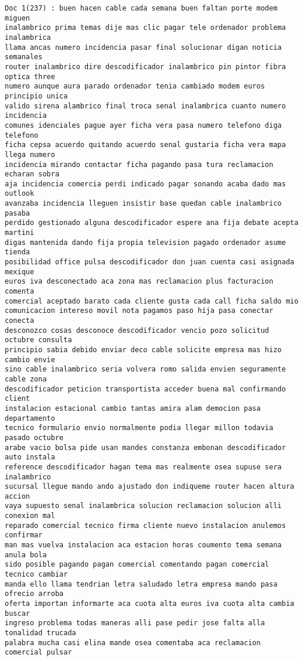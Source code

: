 \begin{Verbatim}[commandchars=\\\{\}]
Doc 1(237) : buen hacen cable cada semana buen faltan porte modem miguen
inalambrico prima temas dije mas clic pagar tele ordenador problema inalambrica
llama ancas numero incidencia pasar final solucionar digan noticia semanales
router inalambrico dire descodificador inalambrico pin pintor fibra optica three
numero aunque aura parado ordenador tenia cambiado modem euros principio unica
valido sirena alambrico final troca senal inalambrica cuanto numero incidencia
comunes idenciales pague ayer ficha vera pasa numero telefono diga telefono
ficha cepsa acuerdo quitando acuerdo senal gustaria ficha vera mapa llega numero
incidencia mirando contactar ficha pagando pasa tura reclamacion echaran sobra
aja incidencia comercia perdi indicado pagar sonando acaba dado mas outlook
avanzaba incidencia lleguen insistir base quedan cable inalambrico pasaba
perdido gestionado alguna descodificador espere ana fija debate acepta martini
digas mantenida dando fija propia television pagado ordenador asume tienda
posibilidad office pulsa descodificador don juan cuenta casi asignada mexique
euros iva desconectado aca zona mas reclamacion plus facturacion comenta
comercial aceptado barato cada cliente gusta cada call ficha saldo mio
comunicacion intereso movil nota pagamos paso hija pasa conectar conecta
desconozco cosas desconoce descodificador vencio pozo solicitud octubre consulta
principio sabia debido enviar deco cable solicite empresa mas hizo cambio envie
sino cable inalambrico seria volvera romo salida envien seguramente cable zona
descodificador peticion transportista acceder buena mal confirmando client
instalacion estacional cambio tantas amira alam democion pasa departamento
tecnico formulario envio normalmente podia llegar millon todavia pasado octubre
arabe vacio bolsa pide usan mandes constanza embonan descodificador auto instala
reference descodificador hagan tema mas realmente osea supuse sera inalambrico
sucursal llegue mando ando ajustado don indiqueme router hacen altura accion
vaya supuesto senal inalambrica solucion reclamacion solucion alli conexion mal
reparado comercial tecnico firma cliente nuevo instalacion anulemos confirmar
man mas vuelva instalacion aca estacion horas coumento tema semana anula bola
sido posible pagando pagan comercial comentando pagan comercial tecnico cambiar
manda ello llama tendrian letra saludado letra empresa mando pasa ofrecio arroba
oferta importan informarte aca cuota alta euros iva cuota alta cambia buscar
ingreso problema todas maneras alli pase pedir jose falta alla tonalidad trucada
palabra mucha casi elina mande osea comentaba aca reclamacion comercial pulsar

\end{Verbatim}
